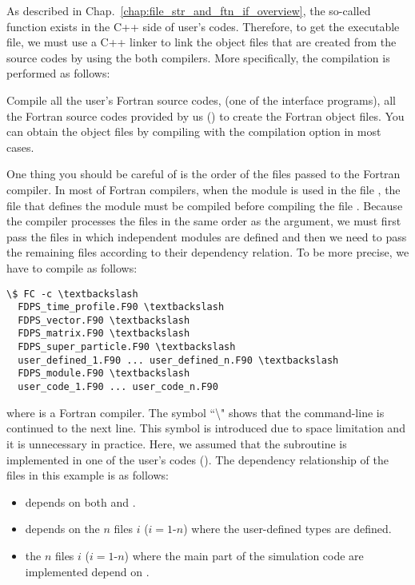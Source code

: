 As described in Chap.~\ref{chap:file_str_and_ftn_if_overview}, the so-called  function exists in the C++ side of user's codes. Therefore, to get the executable file, we must use a C++ linker to link the object files that are created from the source codes by using the both compilers. More specifically, the compilation is performed as follows:
\begin{enumerate}[leftmargin=*,label={[\arabic*]}]
 Compile all the user's Fortran source codes,  (one of the interface programs), all the Fortran source codes provided by us () to create the Fortran object files. You can obtain the object files by compiling with the compilation option  in most cases.

One thing you should be careful of is the order of the files passed to the Fortran compiler. In most of Fortran compilers, when the module  is used in the file , the file that defines the module  must be compiled before compiling the file . Because the compiler processes the files in the same order as the argument, we must first pass the files in which independent modules are defined and then we need to pass the remaining files according to their dependency relation. To be more precise, we have to compile as follows:
\begin{Verbatim}[commandchars=\\\{\}]
\$ FC -c \textbackslash
  FDPS_time_profile.F90 \textbackslash
  FDPS_vector.F90 \textbackslash
  FDPS_matrix.F90 \textbackslash
  FDPS_super_particle.F90 \textbackslash
  user_defined_1.F90 ... user_defined_n.F90 \textbackslash
  FDPS_module.F90 \textbackslash
  user_code_1.F90 ... user_code_n.F90
\end{Verbatim}
where  is a Fortran compiler. The symbol ``\textbackslash" shows that the command-line is continued to the next line. This symbol is introduced due to space limitation and it is unnecessary in practice. Here, we assumed that the subroutine  is implemented in one of the user's codes (). The dependency relationship of the files in this example is as follows:
\begin{itemize}[leftmargin=*]
\item {} depends on both  and .
\item {} depends on the $n$ files $i$ ($i=1$-$n$) where the user-defined types are defined.
\item the $n$ files $i$ ($i=1$-$n$) where the main part of the simulation code are implemented depend on .
\end{itemize}
\label{enum:compile:ftn_sources}


\end{enumerate}
